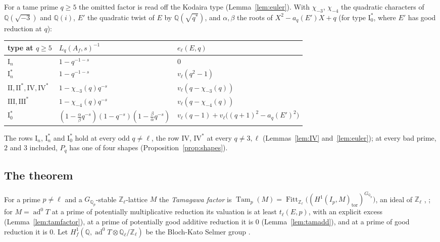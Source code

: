 \documentclass[11pt]{amsart}
\theoremstyle{definition}
\newcommand{\Q}{\mathbb{Q}}
\newcommand{\Z}{\mathbb{Z}}
\newcommand{\ad}{\operatorname{ad}^0}
\newcommand{\Fitt}{\operatorname{Fitt}}
\newcommand{\Tam}{\operatorname{Tam}}
\begin{document}
For a tame prime $q\ge5$ the omitted factor is read off the Kodaira type (Lemma~\ref{lem:euler}). With $\chi_{-3}$, $\chi_{-4}$ the quadratic characters of $\Q(\sqrt{-3})$ and $\Q(i)$, $E'$ the quadratic twist of $E$ by $\Q(\sqrt{q^*})$, and $\alpha,\beta$ the roots of $X^2-a_q(E')X+q$ (for type $\mathrm{I}_0^*$, where $E'$ has good reduction at $q$):
\begin{center}\footnotesize\setlength{\tabcolsep}{4pt}
\begin{tabular}{lll}
\toprule
type at $q\ge5$ & $L_q(A_f,s)^{-1}$ & $e_\ell(E,q)$\\
\midrule
$\mathrm{I}_n$ & $1-q^{-1-s}$ & $0$\\
$\mathrm{I}_n^*$ & $1-q^{-1-s}$ & $v_\ell(q^2-1)$\\
$\mathrm{II},\mathrm{II}^*,\mathrm{IV},\mathrm{IV}^*$ & $1-\chi_{-3}(q)q^{-s}$ & $v_\ell(q-\chi_{-3}(q))$\\
$\mathrm{III},\mathrm{III}^*$ & $1-\chi_{-4}(q)q^{-s}$ & $v_\ell(q-\chi_{-4}(q))$\\
$\mathrm{I}_0^*$ & $(1-\tfrac{\alpha}{\beta}q^{-s})(1-q^{-s})(1-\tfrac{\beta}{\alpha}q^{-s})$ & $v_\ell(q-1)+v_\ell\bigl((q+1)^2-a_q(E')^2\bigr)$\\
\bottomrule
\end{tabular}
\end{center}
The rows $\mathrm{I}_n$, $\mathrm{I}_n^*$ and $\mathrm{I}_0^*$ hold at every odd $q\ne\ell$, the row $\mathrm{IV}$, $\mathrm{IV}^*$ at every $q\ne3,\ell$ (Lemmas~\ref{lem:IV} and~\ref{lem:euler}); at every bad prime, $2$ and $3$ included, $P_q$ has one of four shapes (Proposition~\ref{prop:shapes}).

\subsection{The theorem}
For a prime $p\ne\ell$ and a $G_{\Q_p}$-stable $\Z_\ell$-lattice $M$ the \emph{Tamagawa factor} is $\Tam_p(M)=\Fitt_{\Z_\ell}\bigl((H^1(I_p,M)_{\mathrm{tor}})^{G_{\Q_p}}\bigr)$, an ideal of $\Z_\ell$ \cite[p.~708]{DFG04}, \cite[I.4.2.2]{FPR94}; for $M=\ad T$ at a prime of potentially multiplicative reduction its valuation is at least $t_\ell(E,p)$, with an explicit excess (Lemma~\ref{lem:tamfactor}), at a prime of potentially good additive reduction it is $0$ (Lemma~\ref{lem:tamadd}), and at a prime of good reduction it is $0$. Let $H^1_f(\Q,\ad T\otimes\Q_\ell/\Z_\ell)$ be the Bloch-Kato Selmer group \cite[\S2.1]{DFG04}.
\end{document}
